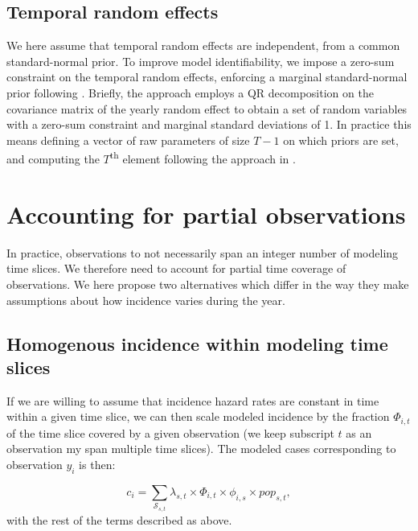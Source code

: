 \documentclass[
]{article}
\begin{document}
\hypertarget{temporal-random-effects}{%
\subsection{Temporal random effects}\label{temporal-random-effects}}

We here assume that temporal random effects are independent, from a common standard-normal prior. To improve model identifiability, we impose a zero-sum constraint on the temporal random effects, enforcing a marginal standard-normal prior following \textcite{sumtozero}. Briefly, the approach employs a QR decomposition on the covariance matrix of the yearly random effect to obtain a set of random variables with a zero-sum constraint and marginal standard deviations of 1. In practice this means defining a vector of raw parameters of size \(T-1\) on which priors are set, and computing the \(T\)\textsuperscript{th} element following the approach in \textcite{sumtozero}.

\hypertarget{accounting-for-partial-observations}{%
\section{Accounting for partial observations}\label{accounting-for-partial-observations}}

In practice, observations to not necessarily span an integer number of modeling time slices. We therefore need to account for partial time coverage of observations. We here propose two alternatives which differ in the way they make assumptions about how incidence varies during the year.

\hypertarget{homogenous-incidence-within-modeling-time-slices}{%
\subsection{Homogenous incidence within modeling time slices}\label{homogenous-incidence-within-modeling-time-slices}}

If we are willing to assume that incidence hazard rates are constant in time within a given time slice, we can then scale modeled incidence by the fraction \(\Phi_{i, t}\) of the time slice covered by a given observation (we keep subscript \(t\) as an observation my span multiple time slices). The modeled cases corresponding to observation \(y_i\) is then:

\[
c_i = \sum_{\mathcal{S}_{s,t}} \lambda_{s,t} \times \Phi_{i,t} \times \phi_{i,s} \times pop_{s,t},
\]
with the rest of the terms described as above.
\end{document}
